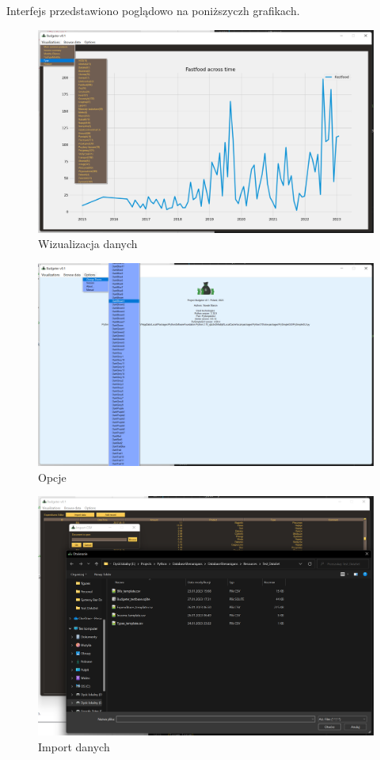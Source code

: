 \documentclass[a4paper,10pt, twoside]{report}
\begin{document}
{Interfejs przedstawiono poglądowo na poniższyczh grafikach.}
\begin{figure}[H]           %
    \caption{Wizualizacja danych}
    \label{fig:Wizualizacja danych}
    \centering  
    \includegraphics[width=12cm]{figures/Interface_Visualizations_v0.3.png}
\end{figure}

\begin{figure}[H]           %
    \caption{Opcje}
    \label{fig:Opcje}
    \centering  
    \includegraphics[width=12cm]{figures/Interface_Options_v0.3.png}
\end{figure}

\begin{figure}[H]           %
    \caption{Import danych}
    \label{fig:Import danych}
    \centering  
    \includegraphics[width=12cm]{figures/Interface_Browse_Import_v0.3.png}
\end{figure}
\end{document}
